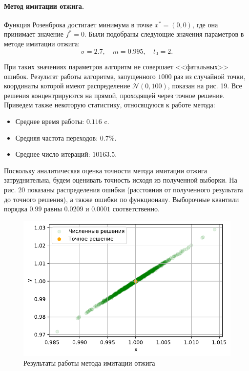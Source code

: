 \documentclass[16pt]{article}
\begin{document}
\paragraph{Метод имитации отжига.}
Функция Розенброка достигает минимума в точке $x^* = (0, 0)$, где она принимает значение $f^* = 0$. Были подобраны следующие значения параметров в методе имитации отжига:
$$\sigma = 2.7, \quad m = 0.995, \quad t_0 = 2.$$

При таких значениях параметров алгоритм не совершает <<фатальных>> ошибок. Результат работы алгоритма, запущенного $1000$ раз из случайной точки, координаты которой имеют распределение $\mathcal{N}(0, 100)$, показан на рис. 19. Все решения концентрируются на прямой, проходящей через точное решение. Приведем также некоторую статистику, относящуюся к работе метода:
\begin{itemize}
	\item Среднее время работы: $0.116$ c.
	\item Средняя частота переходов: $0.7\%$.
	\item Среднее число итераций: $10163.5$.
\end{itemize}

Поскольку аналитическая оценка точности метода имитации отжига затруднительна, будем оценивать точность исходя из полученной выборки. На рис. 20 показаны распределения ошибки (расстояния от полученного результата до точного решения), а также ошибки по функционалу. Выборочные квантили порядка $0.99$ равны $0.0209$ и $0.0001$ соответственно.

\begin{figure}[h]
	\center
	\includegraphics[scale=0.7]{7_1.pdf}
	\caption{Результаты работы метода имитации отжига}
\end{figure}
\end{document}
